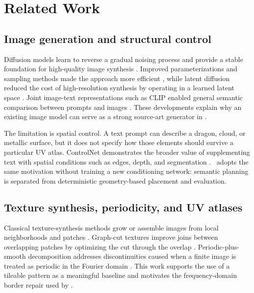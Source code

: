\section{Related Work}
\label{sec:related}

\subsection{Image generation and structural control}

Diffusion models learn to reverse a gradual noising process and provide a stable
foundation for high-quality image synthesis \citep{ho2020ddpm}. Improved
parameterizations and sampling methods made the approach more efficient
\citep{nichol2021improved}, while latent diffusion reduced the cost of
high-resolution synthesis by operating in a learned latent space
\citep{rombach2022latent}. Joint image-text representations such as CLIP enabled
general semantic comparison between prompts and images \citep{radford2021clip}.
These developments explain why an existing image model can serve as a strong
source-art generator in \skinsmith.

The limitation is spatial control. A text prompt can describe a dragon, cloud, or
metallic surface, but it does not specify how those elements should survive a
particular UV atlas. ControlNet demonstrates the broader value of supplementing
text with spatial conditions such as edges, depth, and segmentation
\citep{zhang2023controlnet}. \skinsmith\ adopts the same motivation without
training a new conditioning network: semantic planning is separated from
deterministic geometry-based placement and evaluation.

\subsection{Texture synthesis, periodicity, and UV atlases}

Classical texture-synthesis methods grow or assemble images from local
neighborhoods and patches \citep{efros1999texture,efros2001quilting}. Graph-cut
textures improve joins between overlapping patches by optimizing the cut through
the overlap \citep{kwatra2003graphcut}. Periodic-plus-smooth decomposition
addresses discontinuities caused when a finite image is treated as periodic in
the Fourier domain \citep{moisan2011periodic}. This work supports the use of a
tileable pattern as a meaningful baseline and motivates the frequency-domain
border repair used by \routeA.

